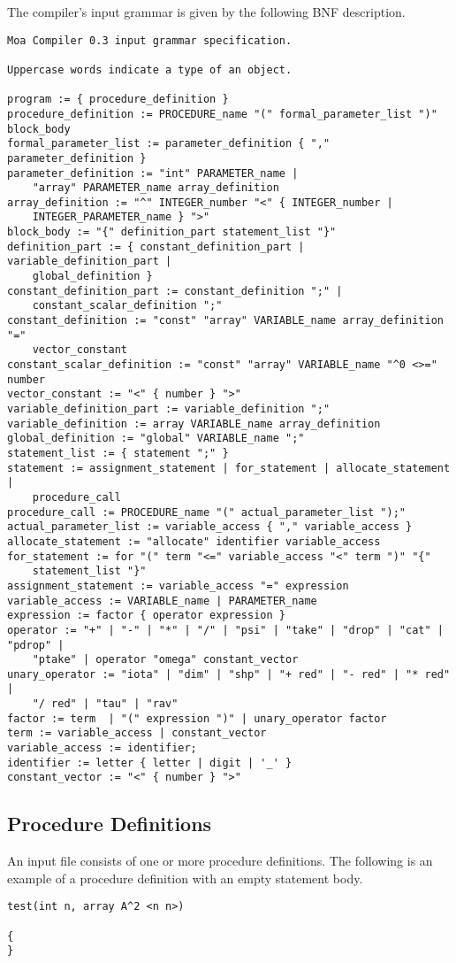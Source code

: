 The compiler's input grammar is given by the following BNF description.
\begin{verbatim}
Moa Compiler 0.3 input grammar specification.

Uppercase words indicate a type of an object.

program := { procedure_definition }
procedure_definition := PROCEDURE_name "(" formal_parameter_list ")" block_body
formal_parameter_list := parameter_definition { "," parameter_definition }
parameter_definition := "int" PARAMETER_name | 
	"array" PARAMETER_name array_definition
array_definition := "^" INTEGER_number "<" { INTEGER_number | 
	INTEGER_PARAMETER_name } ">"
block_body := "{" definition_part statement_list "}"
definition_part := { constant_definition_part | variable_definition_part |
	global_definition }
constant_definition_part := constant_definition ";" | 
	constant_scalar_definition ";"
constant_definition := "const" "array" VARIABLE_name array_definition "="
	vector_constant
constant_scalar_definition := "const" "array" VARIABLE_name "^0 <>=" number
vector_constant := "<" { number } ">"
variable_definition_part := variable_definition ";"
variable_definition := array VARIABLE_name array_definition
global_definition := "global" VARIABLE_name ";"
statement_list := { statement ";" }
statement := assignment_statement | for_statement | allocate_statement |
	procedure_call
procedure_call := PROCEDURE_name "(" actual_parameter_list ");"
actual_parameter_list := variable_access { "," variable_access }
allocate_statement := "allocate" identifier variable_access
for_statement := for "(" term "<=" variable_access "<" term ")" "{" 
	statement_list "}"
assignment_statement := variable_access "=" expression
variable_access := VARIABLE_name | PARAMETER_name
expression := factor { operator expression }
operator := "+" | "-" | "*" | "/" | "psi" | "take" | "drop" | "cat" | "pdrop" |
	"ptake" | operator "omega" constant_vector
unary_operator := "iota" | "dim" | "shp" | "+ red" | "- red" | "* red" | 
	"/ red" | "tau" | "rav"
factor := term  | "(" expression ")" | unary_operator factor
term := variable_access | constant_vector
variable_access := identifier;
identifier := letter { letter | digit | '_' }
constant_vector := "<" { number } ">"

\end{verbatim}

\subsection{Procedure Definitions}
An input file consists of one or more procedure definitions.  The following
is an example of a procedure definition with an empty statement body.
\begin{verbatim}
test(int n, array A^2 <n n>)

{
}
\end{verbatim}

